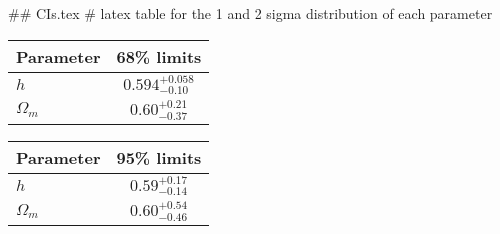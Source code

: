 ## CIs.tex
# latex table for the 1 and 2 sigma distribution of each parameter

\begin{tabular} { l  c}
 Parameter &  68\% limits\\
\hline
{\boldmath$h              $} & $0.594^{+0.058}_{-0.10}    $\\
{\boldmath$\Omega_m       $} & $0.60^{+0.21}_{-0.37}      $\\
\hline
\end{tabular}

\begin{tabular} { l  c}
 Parameter &  95\% limits\\
\hline
{\boldmath$h              $} & $0.59^{+0.17}_{-0.14}      $\\
{\boldmath$\Omega_m       $} & $0.60^{+0.54}_{-0.46}      $\\
\hline
\end{tabular}

